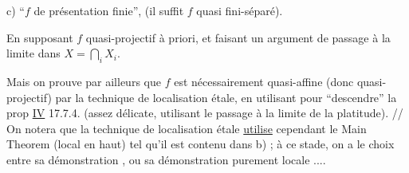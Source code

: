 c)   ``$f$ de présentation finie'',  (il suffit $f$ quasi fini-séparé).

 En supposant $f$ quasi-projectif à priori, et faisant un argument de passage à la limite dans $X=\bigcap\limits_i X_i$.

 Mais on prouve par ailleurs que $f$ est nécessairement quasi-affine (donc quasi-projectif) par la technique de localisation étale, en utilisant pour ``descendre'' la prop \uline{IV} 17.7.4.  (assez délicate,  utilisant le passage à la limite de la platitude). // On notera que la technique de localisation étale \uline{utilise} cependant le Main Theorem (local en haut) tel qu'il est contenu dans b) ; à ce stade, on a le choix entre sa démonstration  , ou sa démonstration purement locale ....
